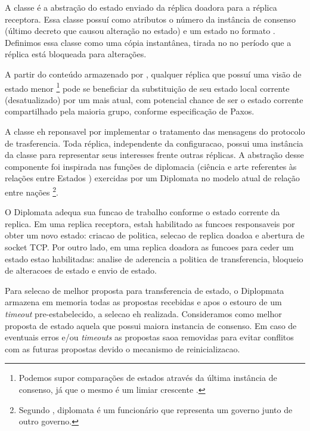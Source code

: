 
A classe  é a abstração do estado enviado da réplica doadora para
a réplica receptora. Essa classe possuí como atributos o número da instância de consenso
(último decreto que causou alteração no estado) e um estado no formato
. Definimos essa classe como uma cópia instantânea, tirada
no no período que a réplica está bloqueada para alterações.

A partir do conteúdo armazenado por , qualquer réplica que possuí
uma visão de estado menor \footnote{Podemos supor comparações de estados através da última
instância de consenso, já que o mesmo é um limiar crescente \cite{vieira-10b}.} pode se
beneficiar da substituição de seu estado local corrente (desatualizado) por um mais atual,
com potencial chance de ser o estado corrente compartilhado pela maioria grupo, conforme
especificação de Paxos.


A classe  eh reponsavel por implementar o tratamento das mensagens do
protocolo de trasferencia. Toda réplica, independente da configuracao, possui uma
instância da classe  para representar seus interesses frente outras
réplicas. A abstração desse componente foi inspirada nas funções de diplomacia (ciência e
arte referentes às relações entre Estados \cite{aurelio}) exercidas por um Diplomata no
modelo atual de relação entre nações \footnote{Segundo , diplomata é
um funcionário que representa um governo junto de outro governo.}.

O Diplomata adequa sua funcao de trabalho conforme o estado corrente da replica. Em uma
replica receptora, estah habilitado as funcoes responsaveis por obter um novo estado:
criacao de politica, selecao de replica doadoa e abertura de socket TCP. Por outro lado,
em uma replica doadora as funcoes para ceder um estado estao habilitadas: analise de
aderencia a politica de transferencia, bloqueio de alteracoes de estado e envio de estado.

Para selecao de melhor proposta para transferencia de estado, o Diplopmata armazena em
memoria todas as propostas recebidas e apos o estouro de um \emph{timeout}
pre-estabelecido, a selecao eh realizada. Consideramos como melhor proposta de estado
aquela que possui maiora instancia de consenso. Em caso de eventuais erros e/ou
\emph{timeouts} as propostas saoa removidas para evitar conflitos com as futuras propostas
devido o mecanismo de reinicializacao.

